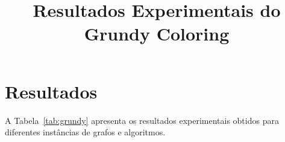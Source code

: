 \documentclass[11pt]{article}
\title{Resultados Experimentais do Grundy Coloring}
\author{}
\date{}
\begin{document}
\maketitle

\section{Resultados}

A Tabela~\ref{tab:grundy} apresenta os resultados experimentais obtidos
para diferentes instâncias de grafos e algoritmos.

\begin{table}[ht]
\centering
\caption{Desempenho dos algoritmos para o Grundy Coloring}
\label{tab:grundy}



\end{table}
\end{document}
